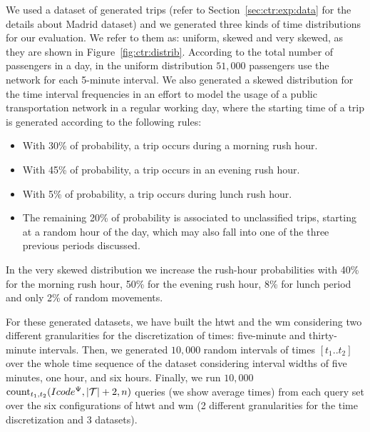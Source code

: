 	We used a dataset of generated trips  (refer to Section~\ref{sec:ctr:exp:data} for the details about Madrid dataset) and we
	generated three kinds of time distributions for our evaluation. We refer to them as: uniform, skewed and very skewed, as they are shown
	in Figure~\ref{fig:ctr:distrib}. 
	According to the total number of passengers in a day, in the uniform distribution $51,\!000$ passengers 
	use the network for each 5-minute interval. 
	We also generated a skewed distribution for the time interval frequencies in an effort to
	model the usage of a public transportation network in a regular working day, where the starting time of a trip
	is generated according to the following rules:
	\begin{itemize}
		\item With 30\% of probability, a trip occurs during a morning rush hour.
		\item With 45\% of probability, a trip occurs in an evening rush hour.
		\item With 5\% of probability, a trip occurs during lunch rush hour.
		\item The remaining 20\% of probability is associated to unclassified trips, starting at a random hour of the day, which may also fall into one of the three previous periods discussed.
	\end{itemize}
	In the very skewed distribution we increase the rush-hour probabilities with
	40\% for the morning rush hour, 50\% for the evening rush hour, 8\% for lunch period and only
	2\% of random movements.
	\medskip

	For these generated datasets, we have built the \gls{htwt} and the \gls{wm} considering two different granularities for the discretization of times: 
	five-minute and thirty-minute intervals. Then, we generated $10,\!000$ random intervals of times $[t_1..t_2]$ over the whole 
	time sequence of the dataset considering interval widths of five minutes, one hour, and six hours.  
	Finally, we run $10,\!000$  $\operatorname{count}_{t_1,t_2}(Icode^{\Psi},|\mathcal{T}|+2,n)$ queries (we show average times) from each query set over 
	the six configurations of \gls{htwt} and \gls{wm}  
	(2 different granularities for the time discretization and 3 datasets).



